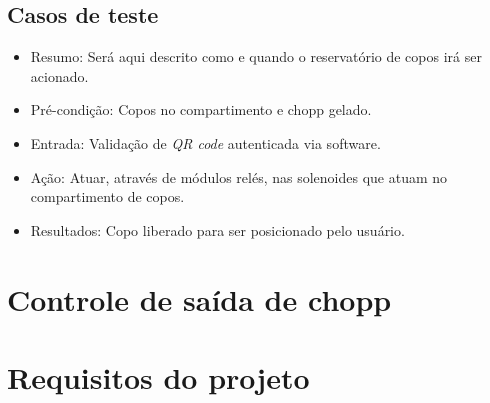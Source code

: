	
\subsection{Casos de teste}

\begin{itemize}

    \item Resumo: Será aqui descrito como e quando o reservatório de copos irá ser acionado. 

    \item Pré-condição: Copos no compartimento e chopp gelado.

    \item Entrada: Validação de \textit{QR code} autenticada via software.

    \item Ação: Atuar, através de módulos relés, nas solenoides que atuam no compartimento de copos.

    \item Resultados: Copo liberado para ser posicionado pelo usuário.

\end{itemize}        



\section{Controle de saída de chopp}
\section{Requisitos do projeto}

